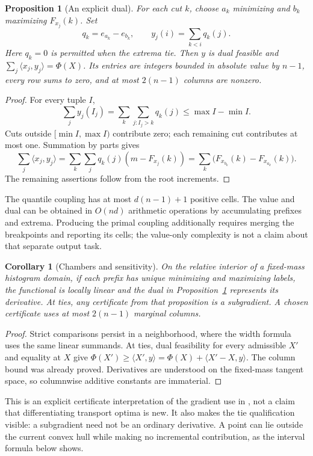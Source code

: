 \documentclass[11pt]{article}
\newtheorem{proposition}[theorem]{Proposition}
\newtheorem{corollary}[theorem]{Corollary}
\theoremstyle{definition}\newtheorem{definition}[theorem]{Definition}
\newcommand{\1}{\mathbf 1}
\begin{document}
\begin{proposition}[An explicit dual]\label{prop:dual}
For each cut $k$, choose $a_k$ minimizing and $b_k$ maximizing $F_{x_j}(k)$.
Set
\[
 q_k=e_{a_k}-e_{b_k},\qquad y_j(i)=\sum_{k<i}q_k(j).
\]
Here $q_k=0$ is permitted when the extrema tie. Then $y$ is dual feasible and
$\sum_j\langle x_j,y_j\rangle=\Phi(X)$. Its entries are integers bounded in
absolute value by $n-1$, every row sums to zero, and at most $2(n-1)$ columns
are nonzero.
\end{proposition}
\begin{proof}
For every tuple $I$,
\[
 \sum_j y_j(I_j)=\sum_k\sum_{j:I_j>k}q_k(j)\le \max I-\min I.
\]
Cuts outside $[\min I,\max I)$ contribute zero; each remaining cut contributes
at most one. Summation by parts gives
\[
 \sum_j\langle x_j,y_j\rangle
 =\sum_k\sum_j q_k(j)(m-F_{x_j}(k))
 =\sum_k\bigl(F_{x_{b_k}}(k)-F_{x_{a_k}}(k)\bigr).
\]
The remaining assertions follow from the root increments.
\end{proof}

The quantile coupling has at most $d(n-1)+1$ positive cells. The value and dual
can be obtained in $O(nd)$ arithmetic operations by accumulating prefixes and
extrema. Producing the primal coupling additionally requires merging the
breakpoints and reporting its cells; the value-only complexity is not a claim
about that separate output task.

\begin{corollary}[Chambers and sensitivity]\label{cor:gradient}
On the relative interior of a fixed-mass histogram domain, if each prefix has
unique minimizing and maximizing labels, the functional is locally linear and
the dual in Proposition~\ref{prop:dual} represents its derivative. At ties,
any certificate from that proposition is a subgradient. A chosen certificate
uses at most $2(n-1)$ marginal columns.
\end{corollary}
\begin{proof}
Strict comparisons persist in a neighborhood, where the width formula uses
the same linear summands. At ties, dual feasibility for every admissible $X'$ and
equality at $X$ give
$\Phi(X')\ge\langle X',y\rangle=\Phi(X)+\langle X'-X,y\rangle$.
The column bound was already proved. Derivatives are understood on the
fixed-mass tangent space, so columnwise additive constants are immaterial.
\end{proof}

This is an explicit certificate interpretation of the gradient use in
\cite[Theorem 4.3 and Appendix 7.1]{mehta}, not a claim that differentiating transport optima is new. It also
makes the tie qualification visible: a subgradient need not be an ordinary
derivative. A point can lie outside the current convex hull while making no
incremental contribution, as the interval formula below shows.
\end{document}
